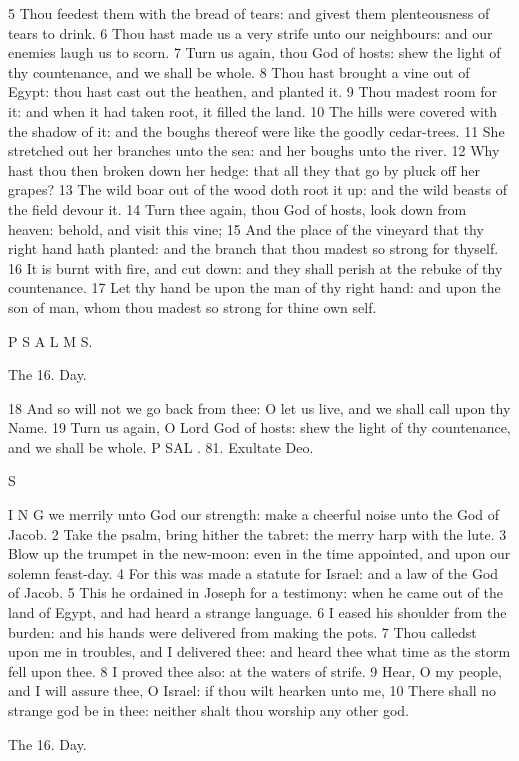 5 Thou feedest them with the bread of tears: and givest them plenteousness of tears to drink. 6 Thou hast made us a very strife unto our neighbours: and our enemies laugh us to scorn. 7 Turn us again, thou God of hosts: shew the light of thy countenance, and we shall be whole. 8 Thou hast brought a vine out of Egypt: thou hast cast out the heathen, and planted it. 9 Thou madest room for it: and when it had taken root, it filled the land. 10 The hills were covered with the shadow of it: and the boughs thereof were like the goodly cedar-trees. 11 She stretched out her branches unto the sea: and her boughs unto the river. 12 Why hast thou then broken down her hedge: that all they that go by pluck off her grapes? 13 The wild boar out of the wood doth root it up: and the wild beasts of the field devour it. 14 Turn thee again, thou God of hosts, look down from heaven: behold, and visit this vine; 15 And the place of the vineyard that thy right hand hath planted: and the branch that thou madest so strong for thyself. 16 It is burnt with fire, and cut down: and they shall perish at the rebuke of thy countenance. 17 Let thy hand be upon the man of thy right hand: and upon the son of man, whom thou madest so strong for thine own self.

P S A L M S.

The 16. Day.

18 And so will not we go back from thee: O let us live, and we shall call upon thy Name. 19 Turn us again, O Lord God of hosts: shew the light of thy countenance, and we shall be whole. P SAL . 81. Exultate Deo.

S

I N G we merrily unto God our strength: make a cheerful noise unto the God of Jacob. 2 Take the psalm, bring hither the tabret: the merry harp with the lute. 3 Blow up the trumpet in the new-moon: even in the time appointed, and upon our solemn feast-day. 4 For this was made a statute for Israel: and a law of the God of Jacob. 5 This he ordained in Joseph for a testimony: when he came out of the land of Egypt, and had heard a strange language. 6 I eased his shoulder from the burden: and his hands were delivered from making the pots. 7 Thou calledst upon me in troubles, and I delivered thee: and heard thee what time as the storm fell upon thee. 8 I proved thee also: at the waters of strife. 9 Hear, O my people, and I will assure thee, O Israel: if thou wilt hearken unto me, 10 There shall no strange god be in thee: neither shalt thou worship any other god.

The 16. Day.

